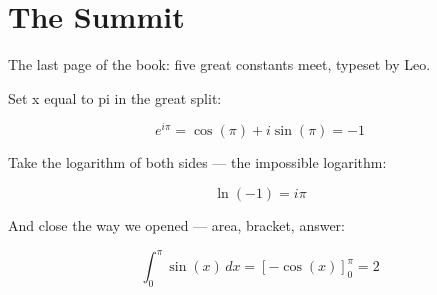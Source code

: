 
\section{The Summit}

The last page of the book: five great constants meet, typeset by Leo.

Set x equal to pi in the great split:

$$ e^{i\pi} = \cos(\pi) + i\sin(\pi) = -1 $$

Take the logarithm of both sides — the impossible logarithm:

$$ \ln(-1) = i\pi $$

And close the way we opened — area, bracket, answer:

$$ \int_0^{\pi} \sin(x)\,dx = \left[ -\cos(x) \right]_0^{\pi} = 2 $$
